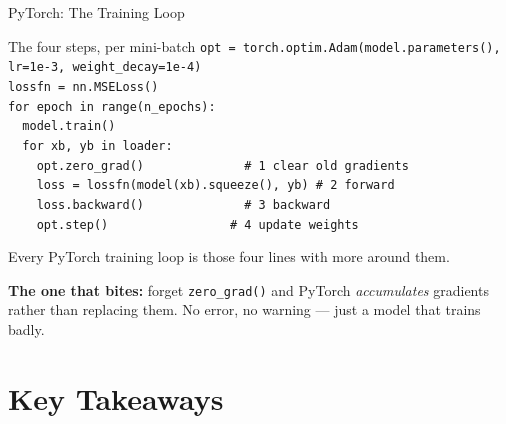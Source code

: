 \documentclass[aspectratio=169, 11pt]{beamer}
\begin{document}
\begin{frame}{PyTorch: The Training Loop}
  \begin{examplebox}{The four steps, per mini-batch}
    {\tiny\linespread{1.2}\selectfont
    \texttt{opt = torch.optim.Adam(model.parameters(), lr=1e-3, weight\_decay=1e-4)}\\
    \texttt{lossfn = nn.MSELoss()}\\[3pt]
    \texttt{for epoch in range(n\_epochs):}\\
    \texttt{\mbox{}\ \ model.train()}\\
    \texttt{\mbox{}\ \ for xb, yb in loader:}\\
    \texttt{\mbox{}\ \ \ \ opt.zero\_grad()\ \ \ \ \ \ \ \ \ \ \ \ \ \ \# 1 clear old gradients}\\
    \texttt{\mbox{}\ \ \ \ loss = lossfn(model(xb).squeeze(), yb)\ \# 2 forward}\\
    \texttt{\mbox{}\ \ \ \ loss.backward()\ \ \ \ \ \ \ \ \ \ \ \ \ \ \# 3 backward}\\
    \texttt{\mbox{}\ \ \ \ opt.step()\ \ \ \ \ \ \ \ \ \ \ \ \ \ \ \ \ \# 4 update weights}
    }
  \end{examplebox}
  Every PyTorch training loop is those four lines with more around them.

  \vspace{0.1cm}
  \textbf{The one that bites:} forget \texttt{zero\_grad()} and PyTorch \emph{accumulates} gradients
  rather than replacing them. No error, no warning --- just a model that trains badly.
\end{frame}

\section{Key Takeaways}

\end{document}
